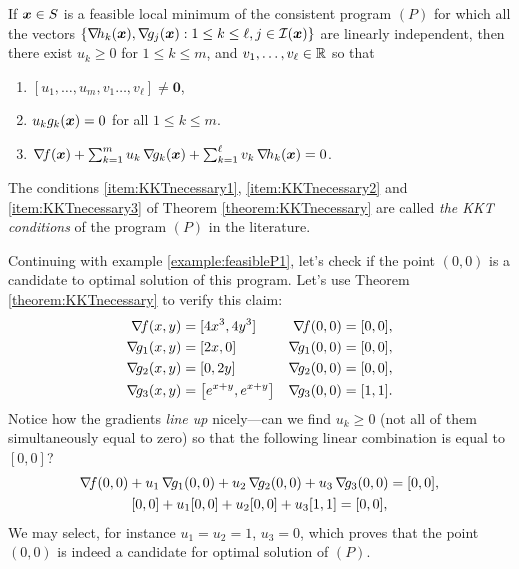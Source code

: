 \begin{theorem}\label{theorem:KKTnecessary}
If $\boldsymbol{x} \in S$ is a feasible local minimum of the consistent program $(P)$ for which all the vectors $\{ \mathop{\nabla\! {h_k}}(\boldsymbol{x}), \mathop{\nabla\! {g_j}}(\boldsymbol{x}) : 1 \leq k \leq \ell, j \in \mathcal{I}(\boldsymbol{x}) \}$ are linearly independent, then there exist $u_k \geq 0$ for $1\leq k \leq m$, and $v_1, \dots, v_\ell \in \mathbb{R}$ so that
\begin{enumerate}
 	\item\label{item:KKTnecessary1} $[u_1, \dotsc, u_m, v_1 \dotsc, v_\ell ] \neq \boldsymbol{0}$,
 	\item\label{item:KKTnecessary2} $u_k g_k(\boldsymbol{x}) = 0$ for all $1 \leq k \leq m$.
 	\item\label{item:KKTnecessary3} $\mathop{\nabla\! {f}}(\boldsymbol{x}) + \sum_{k=1}^m u_k \mathop{\nabla\! {g_k}}(\boldsymbol{x}) + \sum_{k=1}^\ell v_k \mathop{\nabla\! {h_k}}(\boldsymbol{x}) = 0$.
 \end{enumerate}
\end{theorem}

\begin{remark}
The conditions \ref{item:KKTnecessary1}, \ref{item:KKTnecessary2} and \ref{item:KKTnecessary3} of Theorem \ref{theorem:KKTnecessary} are called \emph{the KKT conditions} of the program $(P)$ in the literature.
\end{remark}

\begin{example}
Continuing with example \ref{example:feasibleP1}, let's check if the point $(0,0)$ is a candidate to optimal solution of this program.  Let's use Theorem \ref{theorem:KKTnecessary} to verify this claim:
\begin{align*}
\gradient{f}(x,y) &= [ 4x^3, 4y^3 ] &\gradient{f}(0,0) &= [0,0], \\
\gradient{g_1}(x,y) &= [ 2x, 0 ] &\gradient{g_1}(0,0) &= [0,0], \\
\gradient{g_2}(x,y) &= [0, 2y] &\gradient{g_2}(0,0) &= [0,0], \\
\gradient{g_3}(x,y) &= \big[e^{x+y}, e^{x+y} \big] &\gradient{g_3}(0,0) &= [1,1].
\end{align*}
Notice how the gradients \emph{line up} nicely---can we find $u_k \geq 0$ (not all of them simultaneously equal to zero) so that the following linear combination is equal to $[0,0]$?
\begin{gather*}
\mathop{\nabla\! {f}}(0,0) + u_1 \mathop{\nabla\! {g_1}}(0,0) + u_2 \mathop{\nabla\! {g_2}}(0,0) + u_3 \mathop{\nabla\! {g_3}}(0,0) = [0,0], \\
[0,0] + u_1[0,0] + u_2[0,0] +u_3[1,1] = [0,0],
\end{gather*}
We may select, for instance $u_1=u_2=1$, $u_3=0$, which proves that the point $(0,0)$ is indeed a candidate for optimal solution of $(P)$.
\end{example}

